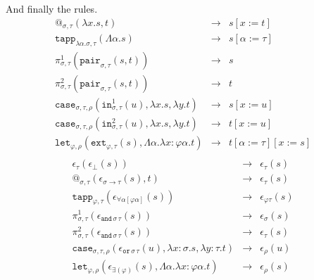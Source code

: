 \documentclass[runningheads,a4paper]{llncs}
\newcommand{\quant}[2]{\forall #1[#2]}
\newcommand{\red}{\longrightarrow}
\newcommand{\arrtype}{\rightarrow}
\newcommand{\abs}[2]{\lambda #1.#2}
\newcommand{\tabs}[2]{\Lambda #1.#2}
\begin{document}
And finally the rules.
\[
\begin{array}{rcl}
@_{\sigma,\tau}(\abs{x}{s},t) & \red & s[x:=t] \\
\mathtt{tapp}_{\abs{\alpha}{\sigma},\tau}(\tabs{\alpha}{s}) & \red &
  s[\alpha:=\tau] \\
\pi^1_{\sigma,\tau}(\mathtt{pair}_{\sigma,\tau}(s,t)) & \red & s \\
\pi^2_{\sigma,\tau}(\mathtt{pair}_{\sigma,\tau}(s,t)) & \red & t \\
\mathtt{case}_{\sigma,\tau,\rho}(\mathtt{in}^1_{\sigma,\tau}(u),
  \abs{x}{s},\abs{y}{t}) & \red & s[x:=u] \\
\mathtt{case}_{\sigma,\tau,\rho}(\mathtt{in}^2_{\sigma,\tau}(u),
  \abs{x}{s},\abs{y}{t}) & \red & t[x:=u] \\
\mathtt{let}_{\varphi,\rho}(\mathtt{ext}_{\varphi,\tau}(s),\tabs{\alpha}{\abs{x:\varphi \alpha}{t}}) & \red & t[\alpha:=\tau][x:=s] \\
\end{array}
\]
\[
\begin{array}{rcl}
\epsilon_\tau(\epsilon_\bot(s)) & \red & \epsilon_\tau(s) \\
@_{\sigma,\tau}(\epsilon_{\sigma \arrtype \tau}(s),t) & \red &
  \epsilon_\tau(s) \\
\mathtt{tapp}_{\varphi,\tau}(
  \epsilon_{\quant{\alpha}{\varphi\alpha}}(s)) & \red &
  \epsilon_{\varphi\tau}(s) \\
\pi^1_{\sigma,\tau}(\epsilon_{\mathtt{and}\,\sigma\,\tau}(s)) & \red &
  \epsilon_\sigma(s) \\
\pi^2_{\sigma,\tau}(\epsilon_{\mathtt{and}\,\sigma\,\tau}(s)) & \red &
  \epsilon_\tau(s) \\
\mathtt{case}_{\sigma,\tau,\rho}(\epsilon_{\mathtt{or}\,\sigma\,\tau}(
  u),\abs{x:\sigma}{s},\abs{y:\tau}{t}) & \red & \epsilon_\rho(u) \\
\mathtt{let}_{\varphi,\rho}(\epsilon_{\exists(\varphi)}(s),\tabs{\alpha}{\abs{x:\varphi\alpha}{t}}) & \red &
  \epsilon_\rho(s) \\
\end{array}
\]
\end{document}
